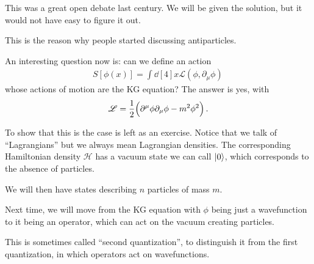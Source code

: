 \documentclass[main.tex]{subfiles}
\begin{document}
This was a great open debate last century. We will be given the solution, but it would not have easy to figure it out. 

This is the reason why people started discussing antiparticles.

An interesting question now is: can we define an action 
%
\begin{align}
S[\phi (x)] = \int \dd[4]{x} \mathscr{L} (\phi, \partial_{\mu } \phi )
\,
\end{align}
%
whose actions of motion are the KG equation? The answer is yes, with 
%
\begin{align}
\mathscr{L} = \frac{1}{2} \qty(\partial^{\mu } \phi \partial_{\mu } \phi - m^2 \phi^2)
\,.
\end{align}

To show that this is the case is left as an exercise.
Notice that we talk of ``Lagrangians'' but we always mean Lagrangian densities. 
The corresponding Hamiltonian density \(\mathscr{H}\) has a vacuum state we can call \(\ket{0}\), which corresponds to the absence of particles. 

We will then have states describing \(n\) particles of mass \(m\). 

Next time, we will move from the KG equation with \(\phi \) being just a wavefunction to it being an operator, which can act on the vacuum creating particles. 

This is sometimes called ``second quantization'', to distinguish it from the first quantization, in which operators act on wavefunctions. 
\end{document}
